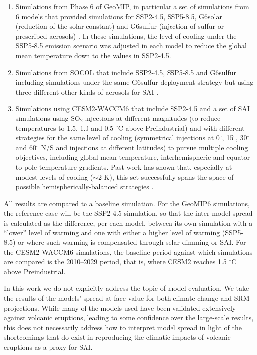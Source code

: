 \documentclass[draft]{agujournal2019}
\begin{document}
\begin{enumerate}
    \item Simulations from Phase 6 of GeoMIP, in particular a set of simulations from 6 models that provided simulations for SSP2-4.5, SSP5-8.5, G6solar (reduction of the solar constant) and G6sulfur (injection of sulfur or prescribed aerosols) \cite{Visioni2021}. In these simulations, the level of cooling under the SSP5-8.5 emission scenario was adjusted in each model to reduce the global mean temperature down to the values in SSP2-4.5.
    \item Simulations from SOCOL that include SSP2-4.5, SSP5-8.5 and G6sulfur including simulations under the same G6sulfur deployment strategy but using three different other kinds of aerosols for SAI \cite{Geurts2026}.
    \item Simulations using CESM2-WACCM6 that include SSP2-4.5 and a set of SAI simulations using SO$_2$ injections at different magnitudes (to reduce temperatures to 1.5, 1.0 and 0.5 $^{\circ}$C above Preindustrial) and with different strategies for the same level of cooling (symmetrical injections at 0$^{\circ}$, 15$^{\circ}$, 30$^{\circ}$ and 60$^{\circ}$ N/S and injections at different latitudes) to pursue multiple cooling objectives, including global mean temperature, interhemispheric and equator-to-pole temperature gradients. Past work has shown that, especially at modest levels of cooling ($\sim$2 K), this set successfully spans the space of possible hemispherically-balanced strategies \cite{zhang_how_2022}.
\end{enumerate}

All results are compared to a baseline simulation. For the GeoMIP6 simulations, the reference case will be the SSP2-4.5 simulation, so that the inter-model spread is calculated as the difference, per each model, between its own simulation with a ``lower'' level of warming and one with either a higher level of warming (SSP5-8.5) or where such warming is compensated through solar dimming or SAI. For the CESM2-WACCM6 simulations, the baseline period against which simulations are compared is the 2010--2029 period, that is, where CESM2 reaches 1.5 $^{\circ}$C above Preindustrial.

In this work we do not explicitly address the topic of model evaluation. We take the results of the models' spread at face value for both climate change and SRM projections. While many of the models used have been validated extensively against volcanic eruptions, leading to some confidence over the large-scale results, this does not necessarily address how to interpret model spread in light of the shortcomings that do exist in reproducing the climatic impacts of volcanic eruptions as a proxy for SAI.
\end{document}
